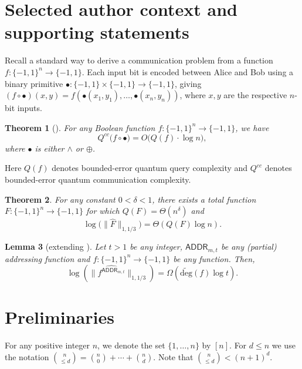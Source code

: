 \documentclass[10pt,a4paper]{article}
\newtheorem{theorem}{Theorem}
\newtheorem{lemma}[theorem]{Lemma}
\theoremstyle{definition}
\newcommand{\bra}[1]{\{#1\}}
\newcommand{\pmone}{\bra{-1,1}}
\newcommand{\adeg}{\widetilde{\mathrm{deg}}}
\newcommand{\asnorm}[2]{\|\widehat{#1}\|_{1,#2}}
\newcommand{\ADD}{\mathsf{ADDR}}
\begin{document}
\section*{Selected author context and supporting statements}
Recall a standard way to derive a communication problem from a function $f:\pmone^n\to\pmone$. Each input bit is encoded between Alice and Bob using a binary primitive $\bullet:\pmone\times\pmone\to\pmone$, giving $(f\circ\bullet)(x,y)=f(\bullet(x_1,y_1),\ldots,\bullet(x_n,y_n))$, where $x,y$ are the respective $n$-bit inputs.
\setcounter{theorem}{0}
\begin{theorem}[\cite{BCW98}]\label{thm: qtm_sim_log_loss}
For any Boolean function $f : \pmone^n \to \pmone$, we have 
\[
Q^{cc}\big(f \circ \bullet\big) = O\big(Q(f)\cdot \log n\big),
\]
where $\bullet$ is either $\wedge$ or $\oplus$.
\end{theorem}
Here $Q(f)$ denotes bounded-error quantum query complexity and $Q^{cc}$ denotes bounded-error quantum communication complexity.
\setcounter{theorem}{3}
\begin{theorem}\label{thm: wtdeg}
For any constant $0 < \delta < 1$, there exists a total function $F : \pmone^n \to \pmone$ for which $Q(F) = \Theta(n^{\delta})$ and 
\[
    \log\big( \asnorm{F}{1/3} \big)= \Theta(Q(F) \log n).
\]
\end{theorem}
\setcounter{theorem}{5}
\begin{lemma}[extending \cite{CM17}]\label{lem: lifting} \label{lemma:degree-norm-lifting}
Let $t > 1$ be any integer, $\ADD_{m,t}$ be any (partial) addressing function and $f : \pmone^n \to \pmone$ be any function. Then,
\[
   \log\left(\asnorm{f^{\ADD_{m,t}}}{1/3}\right) = \Omega\left(\adeg(f) \log t\right).
\]
\end{lemma}

\setcounter{section}{1}
\setcounter{theorem}{9}
\section{Preliminaries}\label{sec: prelims}
For any positive integer $n$, we denote the set $\{1, \dots, n\}$ by $[n]$. For $d \leq n$ we use the notation $\binom{n}{\leq d} = \binom{n}{0} + \cdots + \binom{n}{d}$. Note that $\binom{n}{\leq d} < (n+1)^d$.
\end{document}

